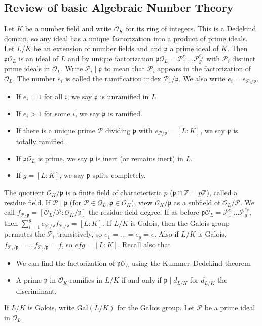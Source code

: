 \documentclass{article}
\theoremstyle{definition}
\begin{document}
\subsection{Review of basic Algebraic Number Theory}
Let $K$ be a number field and write $\mathcal{O}_K$ for its ring of integers. This is a Dedekind domain, so any ideal has a unique factorization into a product of prime ideals. Let $L/K$ be an extension of number fields and and $\mathfrak{p}$ a prime ideal of $K$. Then $\mathfrak{p}\mathcal{O}_L$ is an ideal of $L$ and by unique factorization $\mathfrak{p}\mathcal{O}_L = \mathcal{P}_1^{e_1}\ldots \mathcal{P}_g^{e_g}$ with $\mathcal{P}_i$ distinct prime ideals in $\mathcal{O}_L$. Write $\mathcal{P}_i \mid \mathfrak{p}$ to mean that $\mathcal{P}_i$ appears in the factorization of $\mathcal{O}_L$. The number $e_i$ is called the ramification index $\mathcal{P}_1/\mathfrak{p}$. We also write $e_i = e_{\mathcal{P}_i/\mathfrak{p}}$. 
\begin{itemize}
    \item If $e_i=1$ for all $i$, we say $\mathfrak{p}$ is unramified in $L$.
    \item If $e_i>1$ for some $i$, we say $\mathfrak{p}$ is ramified.
    \item If there is a unique prime $\mathcal{P}$ dividing $\mathfrak{p}$ with $e_{\mathcal{P}/\mathfrak{p}} = [L:K]$, we say $\mathfrak{p}$ is totally ramified.
    \item If $\mathfrak{p}\mathcal{O}_L$ is prime, we say $\mathfrak{p}$ is inert (or remains inert) in $L$.
    \item If $g = [L:K]$, we say $\mathfrak{p}$ splits completely.
\end{itemize}
The quotient $\mathcal{O}_K/\mathfrak{p}$ is a finite field of characteristic $p$ ($\mathfrak{p} \cap \mathbb{Z} = p\mathbb{Z}$), called a residue field. If $\mathcal{P}\mid \mathfrak{p}$ (for $\mathcal{P} \in \mathcal{O}_L, \mathfrak{p} \in \mathcal{O}_K$), view $\mathcal{O}_K/\mathfrak{p}$ as a subfield of $\mathcal{O}_L/\mathcal{P}$. We call $f_{\mathcal{P}/\mathfrak{p}} = [\mathcal{O}_L/\mathcal{P} : \mathcal{O}_K/\mathfrak{p}]$ the residue field degree. If as before $\mathfrak{p}\mathcal{O}_L = \mathcal{P}_1^{e_1}\ldots \mathcal{P}_g^{e_g}$, then $\sum_{i=1}^{g} e_{\mathcal{P}_i/\mathfrak{p}} f_{\mathcal{P}_i/\mathfrak{p}} = [L:K]$. If $L/K$ is Galois, then the Galois group permutes the $\mathcal{P}_i$ transitively, so $e_1 = \ldots = e_g = e$. Also if $L/K$ is Galois, $f_{\mathcal{P}_1/\mathfrak{p}} = \ldots f_{\mathcal{P}_g/\mathfrak{p}} = f$, so $efg = [L:K]$. Recall also that 
\begin{itemize}
    \item We can find the factorization of $\mathfrak{p}\mathcal{O}_L$ using the Kummer--Dedekind theorem.
    \item A prime $\mathfrak{p}$ in $\mathcal{O}_K$ ramifies in $L/K$ if and only if $\mathfrak{p} \mid d_{L/K}$ for $d_{L/K}$ the discriminant.
\end{itemize}
If $L/K$ is Galois, write $\text{Gal}(L/K)$ for the Galois group. Let $\mathcal{P}$ be a prime ideal in $\mathcal{O}_L$.
\end{document}
